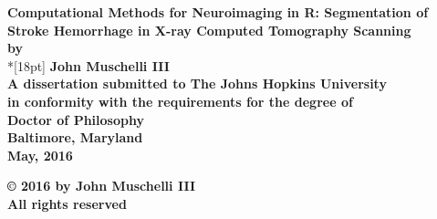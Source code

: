 \documentclass[12pt,oneside,final]{report}
\begin{document}
 \newcommand{\bm}[1]{ \mbox{\boldmath $ #1 $} }
 \newcommand{\bin}[2]{\left(\begin{array}{@{}c@{}} #1 \\ #2
             \end{array}\right) }
 \renewcommand{\contentsname}{Table of Contents}
 \baselineskip=24pt
 
\thispagestyle{empty}
\begin{center}
\vspace*{.25in}
{\bf\LARGE{ Computational Methods for Neuroimaging in R: Segmentation of Stroke Hemorrhage in X-ray Computed Tomography Scanning }}\\
\vspace*{.75in}
{\bf by} \\*[18pt]
\vspace*{.2in}
{\bf John Muschelli III}\\
\vspace*{1in}
{\bf A dissertation submitted to The Johns Hopkins University\\
in conformity with the requirements for the degree of\\
Doctor of Philosophy }\\
\vspace*{.75in}
{\bf Baltimore, Maryland} \\
{\bf May, 2016} \\     %
\vspace*{.5in}
\begin{small}
{\bf \copyright{ }2016 by John Muschelli III} \\ %
{\bf All rights reserved}
\end{small}
\end{center}
 



%
%

\begin{refsection}

\printbibliography[title={References}]
\end{refsection}


\begin{refsection}

\printbibliography[title={References}]
\end{refsection}


%


%
%

%
%
\end{document}
